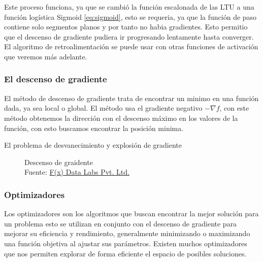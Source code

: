 Este proceso funciona, ya que se cambió la función escalonada de las \gls{LTU} a una función logística Sigmoid \ref{eq:sigmoid}, esto se requeria, ya que la función de paso contiene solo segmentos planos y por tanto no habia gradientes. Esto permitio que el descenso de gradiente pudiera ir progresando lentamente hasta converger. El algoritmo de retroalimentación se puede usar con otras funciones de activación que veremos más adelante.


\subsubsection{El descenso de gradiente\label{sec:gradient-descent}}
El método de descenso de gradiente trata de encontrar un minimo en una función dada, ya sea local o global. El método usa el gradiente negativo ${-\nabla{f}}$, con este método obtenemos la dirección con el descenso máximo en los valores de la función, con esto buscamos encontrar la posición minima.

El problema de desvanecimiento y explosión de gradiente

\begin{figure}[H]
    \centering
    \centerline{}
    \caption{Descenso de graidente\\Fuente: \href{https://fxdatalabs.com}{F(x) Data Labs Pvt. Ltd.}}
    \label{fig:gradient-descent}
\end{figure}



\subsubsection{Optimizadores\label{optimizers}}
Los optimizadores son los algoritmos que buscan encontrar la mejor solución para un problema esto se utilizan en conjunto con el descenso de gradiente para mejorar su eficiencia y rendimiento, generalmente minimizando o maximizando una función objetiva al ajustar sus parámetros. Existen muchos optimizadores que nos permiten explorar de forma eficiente el espacio de posibles soluciones.


